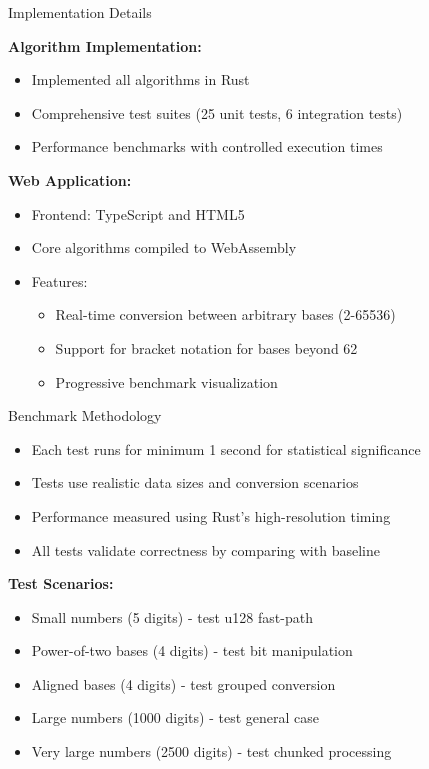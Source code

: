 \documentclass[10pt]{beamer}
\begin{document}
\begin{frame}{Implementation Details}

\textbf{Algorithm Implementation:}
\begin{itemize}
\item Implemented all algorithms in Rust
\item Comprehensive test suites (25 unit tests, 6 integration tests)
\item Performance benchmarks with controlled execution times
\end{itemize}

\vspace{0.3cm}
\textbf{Web Application:}
\begin{itemize}
\item Frontend: TypeScript and HTML5
\item Core algorithms compiled to WebAssembly
\item Features:
  \begin{itemize}
  \item Real-time conversion between arbitrary bases (2-65536)
  \item Support for bracket notation for bases beyond 62
  \item Progressive benchmark visualization
  \end{itemize}
\end{itemize}
\end{frame}

\begin{frame}{Benchmark Methodology}
\begin{itemize}
\item Each test runs for minimum 1 second for statistical significance
\item Tests use realistic data sizes and conversion scenarios
\item Performance measured using Rust's high-resolution timing
\item All tests validate correctness by comparing with baseline
\end{itemize}

\vspace{0.3cm}
\textbf{Test Scenarios:}
\begin{itemize}
\item Small numbers (5 digits) - test u128 fast-path
\item Power-of-two bases (4 digits) - test bit manipulation
\item Aligned bases (4 digits) - test grouped conversion
\item Large numbers (1000 digits) - test general case
\item Very large numbers (2500 digits) - test chunked processing
\end{itemize}
\end{frame}
\end{document}

